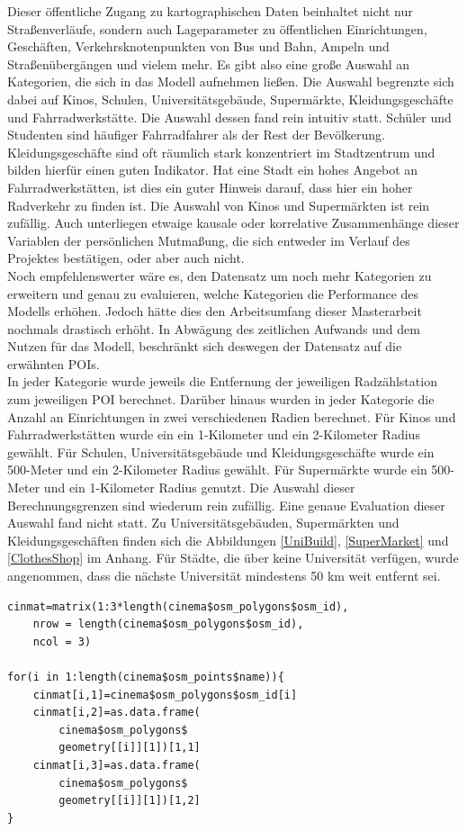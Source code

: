 \documentclass[a4paper,12pt]{thesis}
\begin{document}
Dieser öffentliche Zugang zu kartographischen Daten beinhaltet nicht nur Straßenverläufe, sondern auch Lageparameter zu öffentlichen Einrichtungen, Geschäften, Verkehrsknotenpunkten von Bus und Bahn, Ampeln und Straßenübergängen und vielem mehr. Es gibt also eine große Auswahl an Kategorien, die sich in das Modell aufnehmen ließen. Die Auswahl begrenzte sich dabei auf Kinos, Schulen, Universitätsgebäude, Supermärkte, Kleidungsgeschäfte und Fahrradwerkstätte. Die Auswahl dessen fand rein intuitiv statt. Schüler und Studenten sind häufiger Fahrradfahrer als der Rest der Bevölkerung. Kleidungsgeschäfte sind oft räumlich stark konzentriert im Stadtzentrum und bilden hierfür einen guten Indikator. Hat eine Stadt ein hohes Angebot an Fahrradwerkstätten, ist dies ein guter Hinweis darauf, dass hier ein hoher Radverkehr zu finden ist. Die Auswahl von Kinos und Supermärkten ist rein zufällig. Auch unterliegen etwaige kausale oder korrelative Zusammenhänge dieser Variablen der persönlichen Mutmaßung, die sich entweder im Verlauf des Projektes bestätigen, oder aber auch nicht.\\
Noch empfehlenswerter wäre es, den Datensatz um noch mehr Kategorien zu erweitern und genau zu evaluieren, welche Kategorien die Performance des Modells erhöhen. Jedoch hätte dies den Arbeitsumfang dieser Masterarbeit nochmals drastisch erhöht. In Abwägung des zeitlichen Aufwands und dem Nutzen für das Modell, beschränkt sich deswegen der Datensatz auf die erwähnten POIs.\\
In jeder Kategorie wurde jeweils die Entfernung der jeweiligen Radzählstation zum jeweiligen POI berechnet. Darüber hinaus wurden in jeder Kategorie die Anzahl an Einrichtungen in zwei verschiedenen Radien berechnet. Für Kinos und Fahrradwerkstätten wurde ein ein 1-Kilometer und ein 2-Kilometer Radius gewählt. Für Schulen, Universitätsgebäude und Kleidungsgeschäfte wurde ein 500-Meter und ein 2-Kilometer Radius gewählt. Für Supermärkte wurde ein 500-Meter und ein 1-Kilometer Radius genutzt. Die Auswahl dieser Berechnungsgrenzen sind wiederum rein zufällig. Eine genaue Evaluation dieser Auswahl fand nicht statt. Zu Universitätsgebäuden, Supermärkten und Kleidungsgeschäften finden sich die Abbildungen \ref{UniBuild}, \ref{SuperMarket} und \ref{ClothesShop} im Anhang. Für Städte, die über keine Universität verfügen, wurde angenommen, dass die nächste Universität mindestens 50 km weit entfernt sei.


\begin{minipage}{\linewidth}
\begin{lstlisting}[caption={Speichere die OSM Koordinaten},label=code:matrix]
cinmat=matrix(1:3*length(cinema$osm_polygons$osm_id), 
	nrow = length(cinema$osm_polygons$osm_id), 
	ncol = 3)
	
for(i in 1:length(cinema$osm_points$name)){
   	cinmat[i,1]=cinema$osm_polygons$osm_id[i]
	cinmat[i,2]=as.data.frame(
		cinema$osm_polygons$
		geometry[[i]][1])[1,1]
	cinmat[i,3]=as.data.frame(
		cinema$osm_polygons$
		geometry[[i]][1])[1,2]
}
\end{lstlisting}
\end{minipage}
\end{document}
